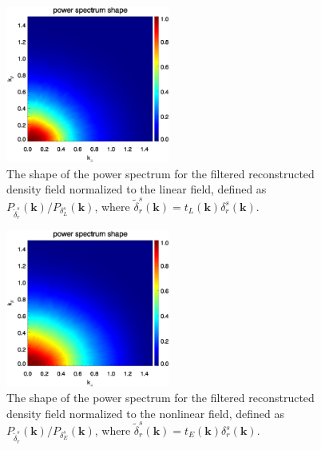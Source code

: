 \documentclass[aps,prd,twocolumn,superscriptaddress,groupedaddress,nofootinbib,amsfont]{revtex4}  %
\newcommand{\bmk}{\bm{k}}
\begin{document}
\begin{figure}[tbp]
\begin{center}
\includegraphics[width=0.48\textwidth]{0.000anishape_deltaRs-tfxLs_4x.eps}
\end{center}
\vspace{-0.7cm}
\caption{The shape of the power spectrum for the filtered reconstructed density 
field normalized to the linear field, defined as 
$P_{\tilde{\delta}_r^s}(\bmk)/P_{\delta_L^s}(\bmk)$, where 
$\tilde{\delta}_r^s(\bmk)=t_L(\bmk)\delta_r^s(\bmk)$.}
\label{fig:shape_Ls}
\end{figure}

\begin{figure}[tbp]
\begin{center}
\includegraphics[width=0.48\textwidth]{0.000anishape_deltaRs-tfxEs_4x.eps}
\end{center}
\vspace{-0.7cm}
\caption{The shape of the power spectrum for the filtered reconstructed density
field normalized to the nonlinear field, defined as
$P_{\tilde{\delta}_r^s}(\bmk)/P_{\delta_E^s}(\bmk)$, where 
$\tilde{\delta}_r^s(\bmk)=t_E(\bmk)\delta_r^s(\bmk)$.}
\label{fig:shape_Es}
\end{figure}
\end{document}
